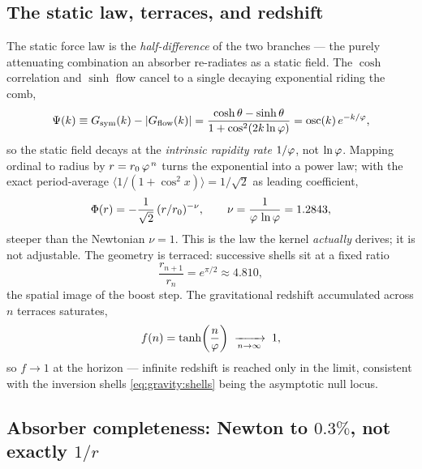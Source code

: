 \subsection{The static law, terraces, and redshift}

The static force law is the \emph{half-difference} of the two branches — the purely attenuating combination an absorber re-radiates as a static field. The $\cosh$ correlation and $\sinh$ flow cancel to a single decaying exponential riding the comb,
\begin{equation}
\Psi(k)\equiv G_{\mathrm{sym}}(k)-|G_{\mathrm{flow}}(k)|
=\frac{\cosh\theta-\sinh\theta}{1+\cos^2(2k\ln\varphi)}
=\operatorname{osc}(k)\,e^{-k/\varphi} ,
\label{eq:gravity:halfdiff}
\end{equation}
so the static field decays at the \emph{intrinsic rapidity rate} $1/\varphi$, not $\ln\varphi$. Mapping ordinal to radius by $r=r_0\,\varphi^{\,n}$ turns the exponential into a power law; with the exact period-average $\langle 1/(1+\cos^2 x)\rangle=1/\sqrt2$ as leading coefficient,
\begin{equation}
\Phi(r)=-\frac{1}{\sqrt2}\,(r/r_0)^{-\nu},
\qquad \nu=\frac{1}{\varphi\,\ln\varphi}=1.2843 ,
\label{eq:gravity:staticlaw}
\end{equation}
steeper than the Newtonian $\nu=1$. This is the law the kernel \emph{actually} derives; it is not adjustable. The geometry is terraced: successive shells sit at a fixed ratio
\begin{equation}
\frac{r_{n+1}}{r_n}=e^{\pi/2}\approx 4.810 ,
\label{eq:gravity:terrace}
\end{equation}
the spatial image of the boost step. The gravitational redshift accumulated across $n$ terraces saturates,
\begin{equation}
f(n)=\tanh\!\left(\frac{n}{\varphi}\right)\;\xrightarrow[n\to\infty]{}\;1 ,
\label{eq:gravity:redshift}
\end{equation}
so $f\to 1$ at the horizon — infinite redshift is reached only in the limit, consistent with the inversion shells \eqref{eq:gravity:shells} being the asymptotic null locus.

\subsection{Absorber completeness: Newton to $0.3\%$, not exactly $1/r$}

